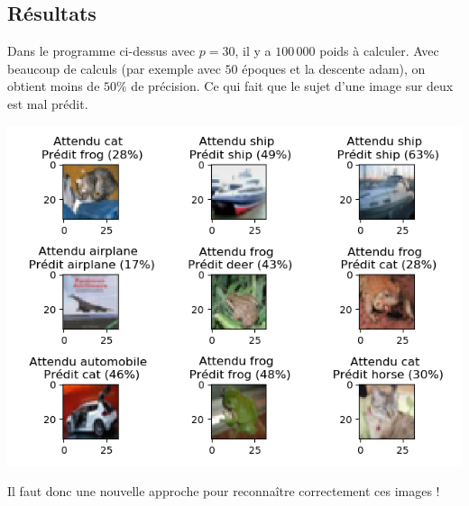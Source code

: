 \documentclass[11pt,class=report,crop=false]{standalone}
\begin{document}
\subsection{Résultats}

Dans le programme ci-dessus avec $p=30$, il y a $100\,000$ poids à calculer.
Avec beaucoup de calculs (par exemple avec $50$ époques et la descente \og{}adam\fg{}), on obtient moins de $50\%$ de précision. Ce qui fait que le sujet d'une image sur deux est mal prédit.


\begin{center}
\includegraphics[scale=\myscale,scale=0.7]{figures/tf2-images-test}
\end{center}

Il faut donc une nouvelle approche pour reconnaître correctement ces images !
\end{document}
